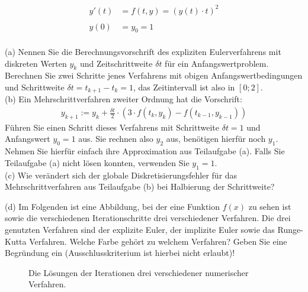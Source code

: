 \documentclass{scrartcl}
\begin{document}
	\begin{align*}
		y'(t) &= f(t,y) = (y(t) \cdot t)^2 \\ \\
		y(0) &= y_0 = 1
	\end{align*}
	\\
	(a)
	Nennen Sie die Berechnungsvorschrift des expliziten Eulerverfahrens mit diskreten Werten $y_k$ und Zeitschrittweite $\delta t$ für ein Anfangswertproblem.
	\n 
	Berechnen Sie zwei Schritte jenes Verfahrens mit obigen Anfangswertbedingungen und Schrittweite $\delta t = t_{k+1} - t_k = 1$, das Zeitintervall ist also in $[0;2]$.
	\lbreak \lbreak \lbreak \lbreak
	\\
	(b)
	Ein Mehrschrittverfahren zweiter Ordnung hat die Vorschrift:
	\begin{align*}
		y_{k+1} := y_k + \frac{\delta t}{2} \cdot \left( 3\cdot f(t_k, y_k) - f(t_{k-1}, y_{k-1}) \right)
	\end{align*}
	Führen Sie einen Schritt dieses Verfahrens mit Schrittweite $\delta t = 1$ und Anfangswert $y_0 = 1$ aus. Sie rechnen also $y_2$ aus, benötigen hierfür noch $y_1$. Nehmen Sie hierfür einfach ihre Approximation aus Teilaufgabe (a). Falls Sie Teilaufgabe (a) nicht lösen konnten, verwenden Sie $y_1=1$.
	\lbreak \lbreak \lbreak \lbreak
	\\
	(c)
	Wie verändert sich der globale Diskretisierungsfehler für das Mehrschrittverfahren aus Teilaufgabe (b) bei Halbierung der Schrittweite?
	
	\newpage
	\noindent(d)
	Im Folgenden ist eine Abbildung, bei der eine Funktion $f(x)$ zu sehen ist sowie die verschiedenen Iterationschritte drei verschiedener Verfahren.
	\n 
	Die drei genutzten Verfahren sind der explizite Euler, der implizite Euler sowie das Runge-Kutta Verfahren. Welche Farbe gehört zu welchem Verfahren? Geben Sie eine Begründung ein (Ausschlusskriterium ist hierbei nicht erlaubt)!
	\begin{figure}[ht]
		\centering
		\caption{Die Lösungen der Iterationen drei verschiedener numerischer Verfahren.}
	\end{figure}
\end{document}
